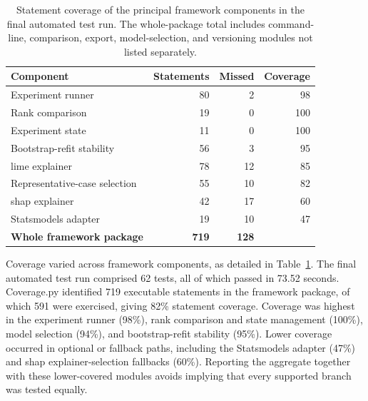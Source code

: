 \begin{table}[htbp]
    \centering
    \small
    \caption{Statement coverage of the principal framework components in the final automated test run. The whole-package total includes command-line, comparison, export, model-selection, and versioning modules not listed separately.}
    \label{tab:test_coverage}
    \begin{tabular}{lrrr}
        \toprule
        \textbf{Component} & \textbf{Statements} & \textbf{Missed} & \textbf{Coverage} \\
        \midrule
        Experiment runner & 80 & 2 & 98\\%
        Rank comparison & 19 & 0 & 100\\%
        Experiment state & 11 & 0 & 100\\%
        Bootstrap-refit stability & 56 & 3 & 95\\%
        \gls{lime} explainer & 78 & 12 & 85\\%
        Representative-case selection & 55 & 10 & 82\\%
        \gls{shap} explainer & 42 & 17 & 60\\%
        Statsmodels adapter & 19 & 10 & 47\\%
        \midrule
        \textbf{Whole framework package} & \textbf{719} & \textbf{128} & \textbf{82\\%
        \bottomrule
    \end{tabular}
\end{table}

Coverage varied across framework components, as detailed in Table~\ref{tab:test_coverage}. The final automated test run comprised 62 tests, all of which passed in 73.52 seconds. Coverage.py identified 719 executable statements in the framework package, of which 591 were exercised, giving 82\% statement coverage. Coverage was highest in the experiment runner (98\%), rank comparison and state management (100\%), model selection (94\%), and bootstrap-refit stability (95\%). Lower coverage occurred in optional or fallback paths, including the Statsmodels adapter (47\%) and \gls{shap} explainer-selection fallbacks (60\%). Reporting the aggregate together with these lower-covered modules avoids implying that every supported branch was tested equally.

